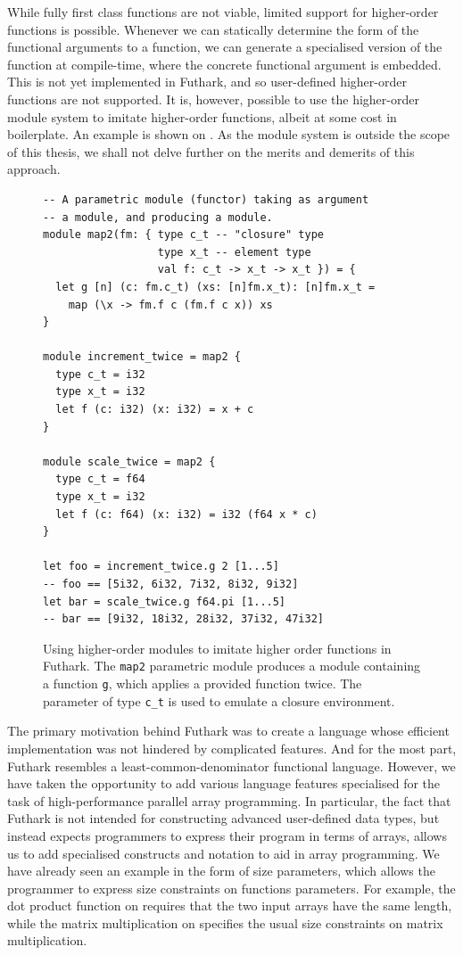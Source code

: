 \begin{description}
  While fully first class functions are not viable, limited support
  for higher-order functions is possible.  Whenever we can statically
  determine the form of the functional arguments to a function, we can
  generate a specialised version of the function at compile-time,
  where the concrete functional argument is embedded.  This is not yet
  implemented in Futhark, and so user-defined higher-order functions
  are not supported.  It is, however, possible to use the higher-order
  module system to imitate higher-order functions, albeit at some cost
  in boilerplate.  An example is shown on .
  As the module system is outside the scope of this thesis, we shall
  not delve further on the merits and demerits of this approach.
\end{description}

\begin{figure}
  \centering
\begin{lstlisting}
-- A parametric module (functor) taking as argument
-- a module, and producing a module.
module map2(fm: { type c_t -- "closure" type
                  type x_t -- element type
                  val f: c_t -> x_t -> x_t }) = {
  let g [n] (c: fm.c_t) (xs: [n]fm.x_t): [n]fm.x_t =
    map (\x -> fm.f c (fm.f c x)) xs
}

module increment_twice = map2 {
  type c_t = i32
  type x_t = i32
  let f (c: i32) (x: i32) = x + c
}

module scale_twice = map2 {
  type c_t = f64
  type x_t = i32
  let f (c: f64) (x: i32) = i32 (f64 x * c)
}

let foo = increment_twice.g 2 [1...5]
-- foo == [5i32, 6i32, 7i32, 8i32, 9i32]
let bar = scale_twice.g f64.pi [1...5]
-- bar == [9i32, 18i32, 28i32, 37i32, 47i32]
\end{lstlisting}
  \caption{Using higher-order modules to imitate higher order
    functions in Futhark.  The \lstinline{map2} parametric module
    produces a module containing a function \lstinline{g}, which
    applies a provided function twice.  The parameter of type
    \lstinline{c_t} is used to emulate a closure environment.}
  \label{fig:faking-hof}
\end{figure}

The primary motivation behind Futhark was to create a language whose
efficient implementation was not hindered by complicated features.
And for the most part, Futhark resembles a least-common-denominator
functional language.  However, we have taken the opportunity to add
various language features specialised for the task of high-performance
parallel array programming.  In particular, the fact that Futhark is
not intended for constructing advanced user-defined data types, but
instead expects programmers to express their program in terms of
arrays, allows us to add specialised constructs and notation to aid in
array programming.  We have already seen an example in the form of
size parameters, which allows the programmer to express size
constraints on functions parameters.  For example, the dot product
function on  requires that the two
input arrays have the same length, while the matrix multiplication on
 specifies the usual size constraints
on matrix multiplication.

